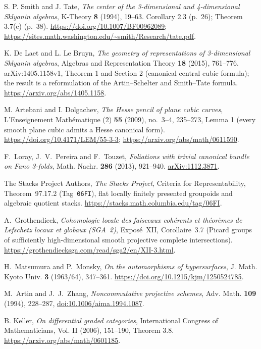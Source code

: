 S. P. Smith and J. Tate,
\emph{The center of the 3-dimensional and 4-dimensional Sklyanin algebras},
K-Theory \textbf{8} (1994), 19--63.
Corollary 2.3 (p.~26); Theorem 3.7(c) (p.~38).
\url{https://doi.org/10.1007/BF00962089};
\url{https://sites.math.washington.edu/~smith/Research/tate.pdf}.

K. De Laet and L. Le Bruyn,
\emph{The geometry of representations of 3-dimensional Sklyanin algebras},
Algebras and Representation Theory \textbf{18} (2015), 761--776.
arXiv:1405.1158v1, Theorem 1 and Section 2 (canonical central cubic formula);
the result is a reformulation of the Artin--Schelter and Smith--Tate formula.
\url{https://arxiv.org/abs/1405.1158}.

M. Artebani and I. Dolgachev,
\emph{The Hesse pencil of plane cubic curves},
L'Enseignement Math\'ematique (2) \textbf{55} (2009), no.~3--4, 235--273,
Lemma 1 (every smooth plane cubic admits a Hesse canonical form).
\url{https://doi.org/10.4171/LEM/55-3-3};
\url{https://arxiv.org/abs/math/0611590}.

F.~Loray, J.~V.~Pereira and F.~Touzet,
\emph{Foliations with trivial canonical bundle on Fano 3-folds},
Math. Nachr. \textbf{286} (2013), 921--940.
\href{https://arxiv.org/abs/1112.3871}{arXiv:1112.3871}.

The Stacks Project Authors,
\emph{The Stacks Project},
Criteria for Representability, Theorem~97.17.2
(Tag~\texttt{06FI}), flat locally finitely presented groupoids and algebraic quotient stacks.
\url{https://stacks.math.columbia.edu/tag/06FI}.

A.~Grothendieck,
\emph{Cohomologie locale des faisceaux coh\'erents et th\'eor\`emes
de Lefschetz locaux et globaux (SGA~2)},
Expos\'e~XII, Corollaire~3.7 (Picard groups of sufficiently
high-dimensional smooth projective complete intersections).
\url{https://grothendiecksga.com/read/sga2/en/XII-3.html}.

H.~Matsumura and P.~Monsky,
\emph{On the automorphisms of hypersurfaces},
J. Math. Kyoto Univ. \textbf{3} (1963/64), 347--361.
\url{https://doi.org/10.1215/kjm/1250524785}.

M.~Artin and J.~J.~Zhang,
\emph{Noncommutative projective schemes},
Adv. Math. \textbf{109} (1994), 228--287,
\href{https://doi.org/10.1006/aima.1994.1087}{doi:10.1006/aima.1994.1087}.

 B. Keller, \emph{On differential graded categories},
International Congress of Mathematicians, Vol. II (2006), 151--190, Theorem 3.8.
\url{https://arxiv.org/abs/math/0601185}.

